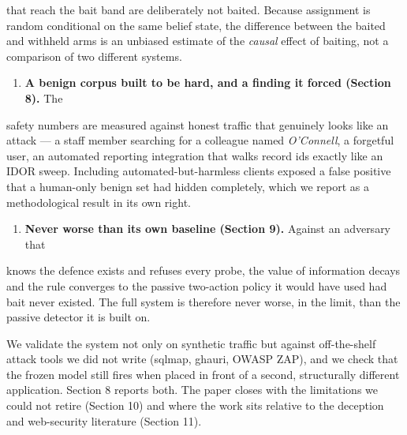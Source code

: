  that reach the bait band are deliberately not baited. Because assignment is
 random conditional on the same belief state, the difference between the baited
 and withheld arms is an unbiased estimate of the \emph{causal} effect of baiting,
 not a comparison of two different systems.

\begin{enumerate}
 \item \textbf{A benign corpus built to be hard, and a finding it forced (Section 8).} The
\end{enumerate}

 safety numbers are measured against honest traffic that genuinely looks like an
 attack --- a staff member searching for a colleague named \emph{O'Connell}, a
 forgetful user, an automated reporting integration that walks record ids
 exactly like an IDOR sweep. Including automated-but-harmless clients exposed a
 false positive that a human-only benign set had hidden completely, which we
 report as a methodological result in its own right.

\begin{enumerate}
 \item \textbf{Never worse than its own baseline (Section 9).} Against an adversary that
\end{enumerate}

 knows the defence exists and refuses every probe, the value of information
 decays and the rule converges to the passive two-action policy it would have
 used had bait never existed. The full system is therefore never worse, in the
 limit, than the passive detector it is built on.

We validate the system not only on synthetic traffic but against off-the-shelf
attack tools we did not write (sqlmap, ghauri, OWASP ZAP), and we check that the
frozen model still fires when placed in front of a second, structurally different
application. Section 8 reports both. The paper closes with the limitations we could
not retire (Section 10) and where the work sits relative to the deception and
web-security literature (Section 11).
